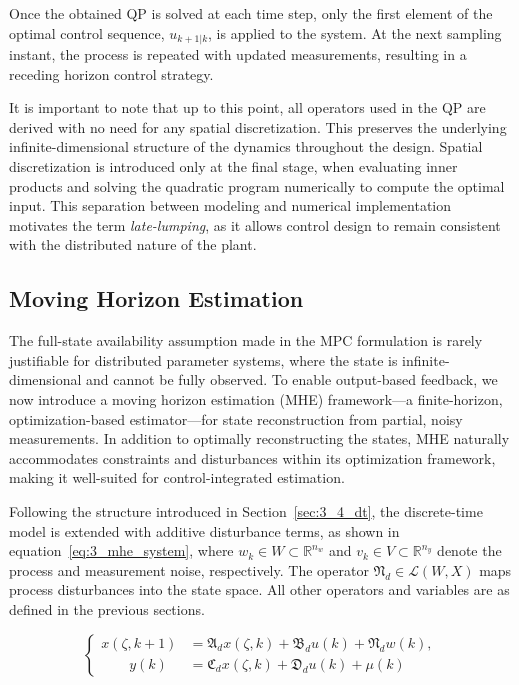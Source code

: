 Once the obtained QP is solved at each time step, only the first element of the optimal control sequence, $u_{k+1|k}$, is applied to the system. At the next sampling instant, the process is repeated with updated measurements, resulting in a receding horizon control strategy.

It is important to note that up to this point, all operators used in the QP are derived with no need for any spatial discretization. This preserves the underlying infinite-dimensional structure of the dynamics throughout the design. Spatial discretization is introduced only at the final stage, when evaluating inner products and solving the quadratic program numerically to compute the optimal input. This separation between modeling and numerical implementation motivates the term \emph{late-lumping}, as it allows control design to remain consistent with the distributed nature of the plant.


\subsection{Moving Horizon Estimation} \label{sec:3_mhe}

The full-state availability assumption made in the MPC formulation is rarely justifiable for distributed parameter systems, where the state is infinite-dimensional and cannot be fully observed. To enable output-based feedback, we now introduce a moving horizon estimation (MHE) framework---a finite-horizon, optimization-based estimator---for state reconstruction from partial, noisy measurements. In addition to optimally reconstructing the states, MHE naturally accommodates constraints and disturbances within its optimization framework, making it well-suited for control-integrated estimation.

Following the structure introduced in Section~\ref{sec:3_4_dt}, the discrete-time model is extended with additive disturbance terms, as shown in equation~\eqref{eq:3_mhe_system}, where $w_k \in W \subset \mathbb{R}^{n_w}$ and $v_k \in V \subset \mathbb{R}^{n_y}$ denote the process and measurement noise, respectively. The operator $\mathfrak{N}_d \in \mathcal{L}(W, X)$ maps process disturbances into the state space. All other operators and variables are as defined in the previous sections.

\begin{equation} \label{eq:3_mhe_system}
\begin{cases}
x(\zeta, k{+}1) &= \mathfrak{A}_d x(\zeta, k) + \mathfrak{B}_d u(k) + \mathfrak{N}_d w(k), \\
\qquad y(k) &= \mathfrak{C}_d x(\zeta, k) + \mathfrak{D}_d u(k) + {\mu}(k)
\end{cases}
\end{equation}


